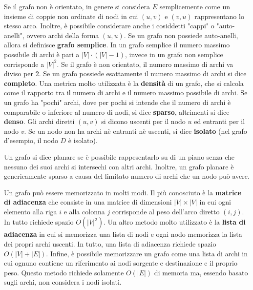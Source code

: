 \documentclass[12pt,a4paper]{book}
\begin{document}
	Se il grafo non è orientato, in genere si considera $E$ semplicemente come un insieme di coppie non ordinate di nodi in cui $(u,v)$ e $(v,u)$ rappresentano lo stesso arco.
	Inoltre, è possibile considerare anche i cosiddetti "cappi" o "auto-anelli", ovvero archi della forma $(u,u)$. Se un grafo non possiede auto-anelli, allora si definisce \textbf{grafo semplice}. In un grafo semplice il numero massimo possibile di archi è pari a $|V|\cdot (|V|-1)$, invece in un grafo non semplice corrisponde a $|V|^2$. Se il grafo è non orientato, il numero massimo di archi va diviso per 2. Se un grafo possiede esattamente il numero massimo di archi si dice \textbf{completo}.
	Una metrica molto utilizzata è la \textbf{densità} di un grafo, che si calcola come il rapporto tra il numero di archi e il numero massimo possibile di archi. Se un grafo ha "pochi" archi, dove per pochi si intende che il numero di archi è comparabile o inferiore al numero di nodi, si dice \textbf{sparso}, altrimenti si dice \textbf{denso}. Gli archi diretti $(u,v)$ si dicono uscenti per il nodo $u$ ed entranti per il nodo $v$. Se un nodo non ha archi nè entranti nè uscenti, si dice \textbf{isolato} (nel grafo d'esempio, il nodo $D$ è isolato).
	
	Un grafo si dice planare se è possibile rappesentarlo su di un piano senza che nessuno dei suoi archi si intersechi con altri archi. Inoltre, un grafo planare è genericamente sparso a causa del limitato numero di archi che un nodo può avere.
	
	Un grafo può essere memorizzato in molti modi. Il più conosciuto è la \textbf{matrice di adiacenza} che consiste in una matrice di dimensioni $|V|\times |V|$ in cui ogni elemento alla riga $i$ e alla colonna $j$ corrisponde al peso dell'arco diretto $(i,j)$. In tutto richiede spazio $O(|V|^2)$. Un altro metodo molto utilizzato è la \textbf{lista di adiacenza} in cui si memorizza una lista di nodi e ogni nodo memorizza la lista dei propri archi uscenti. In tutto, una lista di adiacenza richiede spazio $O(|V|+|E|)$. Infine, è possibile memorizzare un grafo come una lista di archi in cui ognuno contiene un riferimento ai nodi sorgente e destinazione e il proprio peso. Questo metodo richiede solamente $O(|E|)$ di memoria ma, essendo basato sugli archi, non considera i nodi isolati.
	
\end{document}
